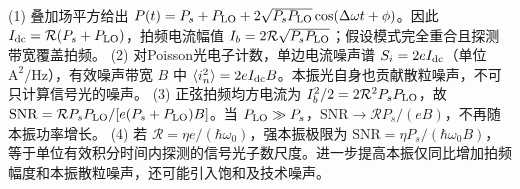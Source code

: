 (1) 叠加场平方给出 \(P(t)=P_s+P_{\rm LO}+2\sqrt{P_sP_{\rm LO}}\cos(\Delta\omega t+\phi)\)。因此 \(I_{\rm dc}=\mathcal R(P_s+P_{\rm LO})\)，拍频电流幅值 \(I_b=2\mathcal R\sqrt{P_sP_{\rm LO}}\)；假设模式完全重合且探测带宽覆盖拍频。
(2) 对Poisson光电子计数，单边电流噪声谱 \(S_i=2eI_{\rm dc}\)（单位 \(\mathrm{A^2/Hz}\)），有效噪声带宽 \(B\) 中 \(\langle i_n^2\rangle=2eI_{\rm dc}B\)。本振光自身也贡献散粒噪声，不可只计算信号光的噪声。
(3) 正弦拍频均方电流为 \(I_b^2/2=2\mathcal R^2P_sP_{\rm LO}\)，故 \(\mathrm{SNR}=\mathcal R P_sP_{\rm LO}/[e(P_s+P_{\rm LO})B]\)。当 \(P_{\rm LO}\gg P_s\)，\(\mathrm{SNR}\to\mathcal R P_s/(eB)\)，不再随本振功率增长。
(4) 若 \(\mathcal R=\eta e/(\hbar\omega_0)\)，强本振极限为 \(\mathrm{SNR}=\eta P_s/(\hbar\omega_0B)\)，等于单位有效积分时间内探测的信号光子数尺度。进一步提高本振仅同比增加拍频幅度和本振散粒噪声，还可能引入饱和及技术噪声。
